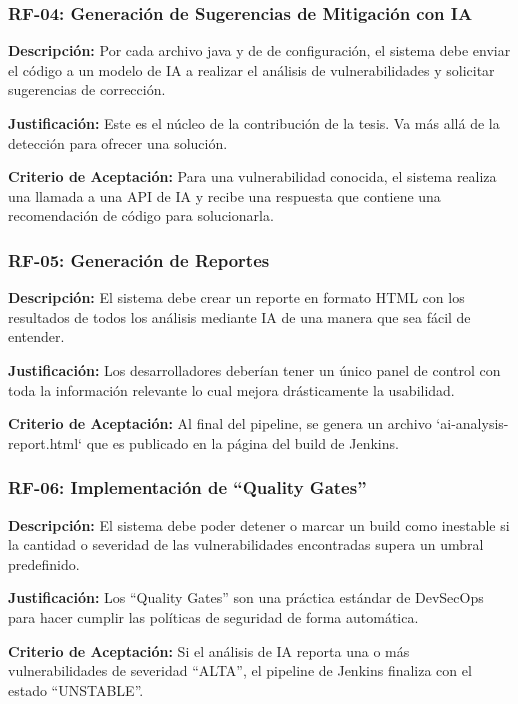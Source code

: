 \subsubsection{RF-04: Generación de Sugerencias de Mitigación con IA}

\textbf{Descripción:} Por cada archivo java y de de configuración, el sistema debe enviar el código a un modelo de IA a realizar el análisis de vulnerabilidades y solicitar sugerencias de corrección.

\textbf{Justificación:} Este es el núcleo de la contribución de la tesis. Va más allá de la detección para ofrecer una solución.

\textbf{Criterio de Aceptación:} Para una vulnerabilidad conocida, el sistema realiza una llamada a una API de IA y recibe una respuesta que contiene una recomendación de código para solucionarla.

\subsubsection{RF-05: Generación de Reportes}

\textbf{Descripción:} El sistema debe crear un reporte en formato HTML con los resultados de todos los análisis mediante IA de una manera que sea fácil de entender.

\textbf{Justificación:} Los desarrolladores deberían tener un único panel de control con toda la información relevante lo cual mejora drásticamente la usabilidad.

\textbf{Criterio de Aceptación:} Al final del pipeline, se genera un archivo `ai-analysis-report.html` que es publicado en la página del build de Jenkins.

\subsubsection{RF-06: Implementación de ``Quality Gates''}

\textbf{Descripción:} El sistema debe poder detener o marcar un build como inestable si la cantidad o severidad de las vulnerabilidades encontradas supera un umbral predefinido.

\textbf{Justificación:} Los ``Quality Gates'' son una práctica estándar de DevSecOps para hacer cumplir las políticas de seguridad de forma automática.

\textbf{Criterio de Aceptación:} Si el análisis de IA reporta una o más vulnerabilidades de severidad ``ALTA'', el pipeline de Jenkins finaliza con el estado ``UNSTABLE''.


